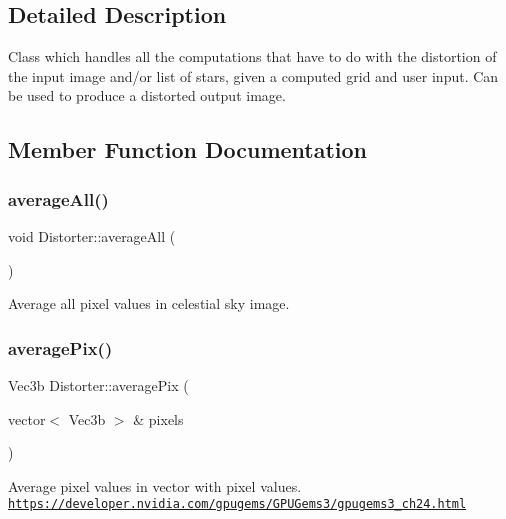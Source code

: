 \subsection{Detailed Description}
Class which handles all the computations that have to do with the distortion of the input image and/or list of stars, given a computed grid and user input. Can be used to produce a distorted output image. 

\subsection{Member Function Documentation}
\mbox{\label{class_distorter_ac4b35b33e2639646cd2c240d304636f1}} 
\subsubsection{\texorpdfstring{average\+All()}{averageAll()}}
{\footnotesize\ttfamily void Distorter\+::average\+All (\begin{DoxyParamCaption}{ }\end{DoxyParamCaption})\hspace{0.3cm}{\ttfamily [inline]}}

Average all pixel values in celestial sky image. \mbox{\label{class_distorter_a7c6452da26a30ce0e4e385b4f055945d}} 
\subsubsection{\texorpdfstring{average\+Pix()}{averagePix()}}
{\footnotesize\ttfamily Vec3b Distorter\+::average\+Pix (\begin{DoxyParamCaption}\item[{vector$<$ Vec3b $>$ \&}]{pixels }\end{DoxyParamCaption})\hspace{0.3cm}{\ttfamily [inline]}}

Average pixel values in vector with pixel values. \href{https://developer.nvidia.com/gpugems/GPUGems3/gpugems3_ch24.html}{\tt https\+://developer.\+nvidia.\+com/gpugems/\+G\+P\+U\+Gems3/gpugems3\+\_\+ch24.\+html} \mbox{\label{class_distorter_ae38723ab2030696a6326879a217d106b}} 

